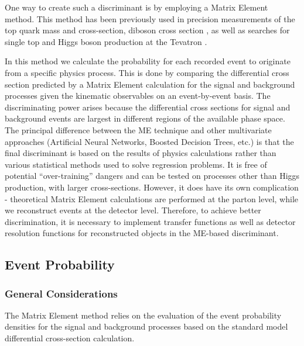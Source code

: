 \documentclass{cmspaper}
\begin{document}
One way to create such a discriminant is by employing a Matrix Element method. This method has been previously used in precision
measurements of the top quark mass \cite{ref:CDFTopMass,ref:D0TopMass} and cross-section, diboson cross section \cite{ref:CDFDiboson}, 
as well as searches for single top \cite{ref:CDFSingleTop,ref:D0SingleTop} and Higgs boson production at the Tevatron \cite{ref:CDFHiggs,ref:D0Higgs}.

In this method we calculate the probability for each recorded event to originate from a specific physics process.  
This is done by comparing the differential cross section predicted by a Matrix Element calculation for the signal and background processes given the kinematic observables
on an event-by-event basis. The discriminating power arises because the differential cross sections for signal and background
events are largest in different regions of the available phase space. The principal difference between the ME technique and other
multivariate approaches (Artificial Neural Networks, Boosted Decision Trees, etc.) is that the final discriminant is based on the results
of physics calculations rather than various statistical methods used to solve regression problems. It is free of potential ``over-training''
dangers and can be tested on processes other than Higgs production, with larger cross-sections. However, it does have its own complication - 
theoretical Matrix Element calculations are performed at the parton level, while we reconstruct events at the detector level. 
Therefore, to achieve better discrimination, it is necessary to implement transfer functions as well as detector resolution functions for
reconstructed objects in the ME-based discriminant.

\subsection{Event Probability}
\label{sec:Evt_Prob}
\subsubsection{General Considerations}
The Matrix Element method relies on the evaluation of the event probability densities for the signal and background processes based on the 
standard model differential cross-section calculation. 
\end{document}
